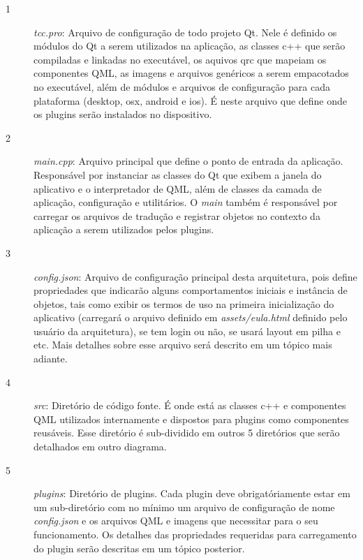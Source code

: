 \begin{description}
	\item[1] \textit{tcc.pro}: Arquivo de configuração de todo projeto Qt. Nele é definido os módulos do Qt a serem utilizados na aplicação, as classes c++ que serão compiladas e linkadas no executável, os aquivos qrc que mapeiam os componentes QML, as imagens e arquivos genéricos a serem empacotados no executável, além de módulos e arquivos de configuração para cada plataforma (desktop, osx, android e ios). É neste arquivo que define onde os plugins serão instalados no dispositivo.

	\item[2] \textit{main.cpp}: Arquivo principal que define o ponto de entrada da aplicação. Responsável por instanciar as classes do Qt que exibem a janela do aplicativo e o interpretador de QML, além de classes da camada de aplicação, configuração e utilitários. O \textit{main} também é responsável por carregar os arquivos de tradução e registrar objetos no contexto da aplicação a serem utilizados pelos plugins.

	\item[3] \textit{config.json}: Arquivo de configuração principal desta arquitetura, pois define propriedades que indicarão alguns comportamentos iniciais e instância de objetos, tais como exibir os termos de uso na primeira inicialização do aplicativo (carregará o arquivo definido em \textit{assets/eula.html} definido pelo usuário da arquitetura), se tem login ou não, se usará layout em pilha e etc. Mais detalhes sobre esse arquivo será descrito em um tópico mais adiante.

	\item[4] \textit{src}: Diretório de código fonte. É onde está as classes c++ e componentes QML utilizados internamente e dispostos para plugins como componentes reusáveis. Esse diretório é sub-dividido em outros 5 diretórios que serão detalhados em outro diagrama.

	\item[5] \textit{plugins}: Diretório de plugins. Cada plugin deve obrigatóriamente estar em um sub-diretório com no mínimo um arquivo de configuração de nome \textit{config.json} e os arquivos QML e imagens que necessitar para o seu funcionamento. Os detalhes das propriedades requeridas para carregamento do plugin serão descritas em um tópico posterior.


\end{description}
